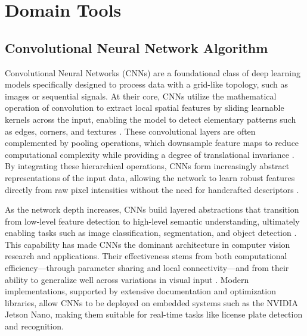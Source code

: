 %
%
%

\chapter{Domain Tools}


\section{Convolutional Neural Network Algorithm}

\noindent
Convolutional Neural Networks (CNNs) are a foundational class of deep learning models specifically designed to process data with a grid-like topology, such as images or sequential signals. At their core, CNNs utilize the mathematical operation of convolution to extract local spatial features by sliding learnable kernels across the input, enabling the model to detect elementary patterns such as edges, corners, and textures \cite{goodfellow2016deep}. These convolutional layers are often complemented by pooling operations, which downsample feature maps to reduce computational complexity while providing a degree of translational invariance \cite{insights2018cnn}. By integrating these hierarchical operations, CNNs form increasingly abstract representations of the input data, allowing the network to learn robust features directly from raw pixel intensities without the need for handcrafted descriptors \cite{purwono2020understanding}.

As the network depth increases, CNNs build layered abstractions that transition from low-level feature detection to high-level semantic understanding, ultimately enabling tasks such as image classification, segmentation, and object detection \cite{lecun1998gradient}. This capability has made CNNs the dominant architecture in computer vision research and applications. Their effectiveness stems from both computational efficiency—through parameter sharing and local connectivity—and from their ability to generalize well across variations in visual input \cite{wu2025cnn}. Modern implementations, supported by extensive documentation and optimization libraries, allow CNNs to be deployed on embedded systems such as the NVIDIA Jetson Nano, making them suitable for real-time tasks like license plate detection and recognition.

